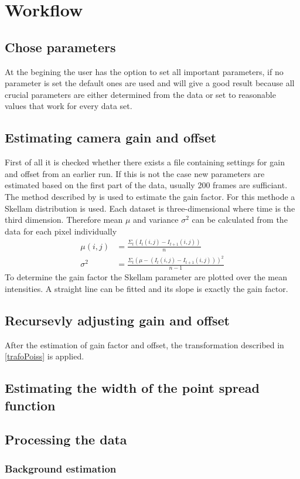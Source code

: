 \section{Workflow}
\subsection{Chose parameters}
At the begining the user has the option to set all important parameters, if no parameter is set the default ones are used and will give a good result because all crucial parameters are either determined from the data or set to reasonable values that work for every data set.
\subsection{Estimating camera gain and offset}
First of all it is checked whether there exists a file containing settings for gain and offset from an earlier run. If this is not the case new parameters are estimated based on the first part of the data, usually 200 frames are sufficiant.
The method described by \cite{skellam} is used to estimate the
gain factor. For this methode a Skellam distribution is used. 
Each dataset is three-dimensional where time is the third
dimension. Therefore mean $\mu$ and variance $\sigma^2$ can be calculated from
the data for each pixel individually
\begin{align}
	\mu(i,j) & = \frac{\Sigma_t(I_t(i,j)-I_{t+1}(i,j))}{n}\\
	\sigma^2 & = \frac{\Sigma_t(\mu-(I_t(i,j)-I_{t+1}(i,j)))^2}{n-1}
\end{align} 
To determine the gain factor the Skellam parameter are plotted over the mean
intensities. A straight line can be fitted and its slope is exactly the gain
factor.
\subsection{Recursevly adjusting gain and offset}
After the estimation of gain factor and offset, the transformation described in \ref{trafoPoiss} is applied.
\subsection{Estimating the width of the point spread function}
\subsection{Processing the data}
\subsubsection{Background estimation}
